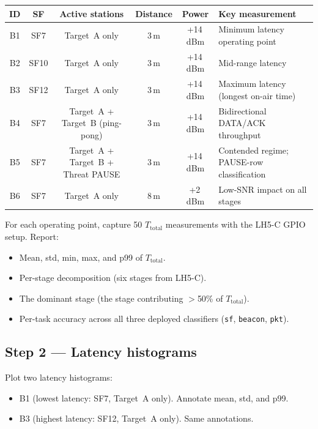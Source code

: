 \documentclass[11pt,letterpaper]{article}
\begin{document}
\begin{table}[h!]
	\centering
	\renewcommand{\arraystretch}{1.3}
	\begin{tabularx}{\textwidth}{c c c c c X}
		\toprule
		\textbf{ID} & \textbf{SF} & \textbf{Active stations} & \textbf{Distance} & \textbf{Power} & \textbf{Key measurement} \\
		\midrule
		B1 & SF7  & Target~A only                      & 3\,m & +14\,dBm & Minimum latency operating point \\
		B2 & SF10 & Target~A only                      & 3\,m & +14\,dBm & Mid-range latency \\
		B3 & SF12 & Target~A only                      & 3\,m & +14\,dBm & Maximum latency (longest on-air time) \\
		B4 & SF7  & Target~A + Target~B (ping-pong)    & 3\,m & +14\,dBm & Bidirectional DATA/ACK throughput \\
		B5 & SF7  & Target~A + Target~B + Threat PAUSE & 3\,m & +14\,dBm & Contended regime; PAUSE-row classification \\
		B6 & SF7  & Target~A only                      & 8\,m & +2\,dBm  & Low-\mbox{SNR} impact on all stages \\
		\bottomrule
	\end{tabularx}
\end{table}

For each operating point, capture 50 $T_{\text{total}}$ measurements with the LH5-C \mbox{GPIO} setup. Report:
\begin{itemize}[leftmargin=2em]
	\item Mean, std, min, max, and p99 of $T_{\text{total}}$.
	\item Per-stage decomposition (six stages from LH5-C).
	\item The dominant stage (the stage contributing $>$50\% of $T_{\text{total}}$).
	\item Per-task accuracy across all three deployed classifiers (\texttt{sf}, \texttt{beacon}, \texttt{pkt}).
\end{itemize}

\subsection{Step 2 --- Latency histograms}
Plot two latency histograms:
\begin{itemize}[leftmargin=2em]
	\item B1 (lowest latency: SF7, Target~A only). Annotate mean, std, and p99.
	\item B3 (highest latency: SF12, Target~A only). Same annotations.
\end{itemize}
\end{document}
